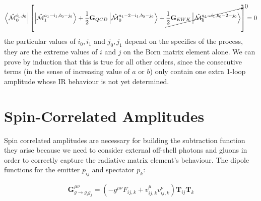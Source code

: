 \documentclass[a4paper]{article}
\def \Int#1{\int d#1 \hskip0.1cm}
\def \MBra#1#2#3{\left<\hat{\mathcal{M}}_{#1}^{#2,#3}\right|}
\def \MKet#1#2#3{\left|\hat{\mathcal{M}}_{#1}^{#2,#3}\right>}
\begin{document}
\begin{equation}
 \MBra{0}{i_1}{j_0}
 \left[
 \MKet{1}{a_1-i_1}{b_0-j_0}
 +
 \frac{1}{2}\textbf{G}_{QCD}\MKet{0}{a_1-2-i_1}{b_0-j_0}
 +
 \cancelto{0}{\frac{1}{2}\textbf{G}_{EWK}\MKet{0}{a_1-i_1}{b_0-2-j_0}}
 \right]=0
\end{equation}
the particular values of $i_0,i_1$ and $j_0,j_1$ depend on the specifics of the process, they are the 
extreme values of $i$ and $j$ on the Born matrix element alone.
We can prove by induction that this is true for all other orders, since the consecutive terms (in the sense of increasing value of $a$ or $b$) only contain one extra 1-loop amplitude whose IR behaviour is not yet determined.


% 



\newpage
\section{Spin-Correlated Amplitudes}
Spin correlated amplitudes are necessary for building the subtraction function they arise because 
we need to consider external off-shell photons and gluons in order to correctly capture the 
radiative matrix element's behaviour. The dipole functions for the emitter $p_{ij}$ and spectator $p_k$:

\begin{equation}
 \textbf{G}_{g\rightarrow g_ig_j}^{\mu\nu} = 
 \left(
 -g^{\mu\nu}F_{ij,k}
 +
 v_{ij,k}^\mu v_{ij,k}^\nu 
\right) \textbf{T}_{ij}\textbf{T}_k
\end{equation}
\end{document}
